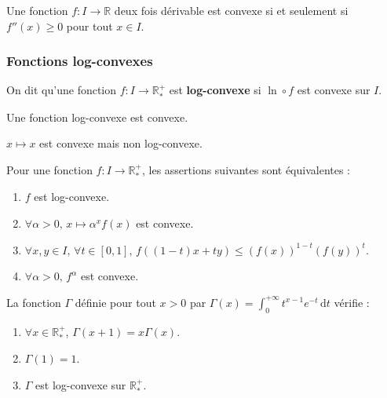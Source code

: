   \begin{proposition}
    Une fonction $f : I \rightarrow \mathbb{R}$ deux fois dérivable est convexe si et seulement si $f''(x) \geq 0$ pour tout $x \in I$.
  \end{proposition}

  \subsubsection{Fonctions log-convexes}


  \begin{definition}
    On dit qu'une fonction $f : I \rightarrow \mathbb{R}^+_*$ est \textbf{log-convexe} si $\ln \circ f$ est convexe sur $I$.
  \end{definition}

  \begin{proposition}
    Une fonction log-convexe est convexe.
  \end{proposition}

  \begin{cexample}
    $x \mapsto x$ est convexe mais non log-convexe.
  \end{cexample}

  \begin{theorem}
    Pour une fonction $f : I \rightarrow \mathbb{R}^+_*$, les assertions suivantes sont équivalentes :
    \begin{enumerate}[label={\bfseries(\roman*)}]
      \item $f$ est log-convexe.
      \item $\forall \alpha > 0, \, x \mapsto \alpha^x f(x)$ est convexe.
      \item $\forall x, y \in I, \, \forall t \in [0,1], \, f((1-t)x + ty) \leq (f(x))^{1-t} (f(y))^t$.
      \item $\forall \alpha > 0, \, f^\alpha$ est convexe.
    \end{enumerate}
  \end{theorem}


  \begin{lemma}
    \label{229-2}
    La fonction $\Gamma$ définie pour tout $x > 0$ par $\Gamma(x) = \int_0^{+\infty} t^{x-1} e^{-t} \, \mathrm{d}t$ vérifie :
    \begin{enumerate}[label={\bfseries(\roman*)}]
      \item \label{229-3} $\forall x \in \mathbb{R}^+_*$, $\Gamma(x+1) = x\Gamma(x)$.
      \item \label{229-4} $\Gamma(1) = 1$.
      \item \label{229-5} $\Gamma$ est log-convexe sur $\mathbb{R}^+_*$.
    \end{enumerate}
  \end{lemma}

